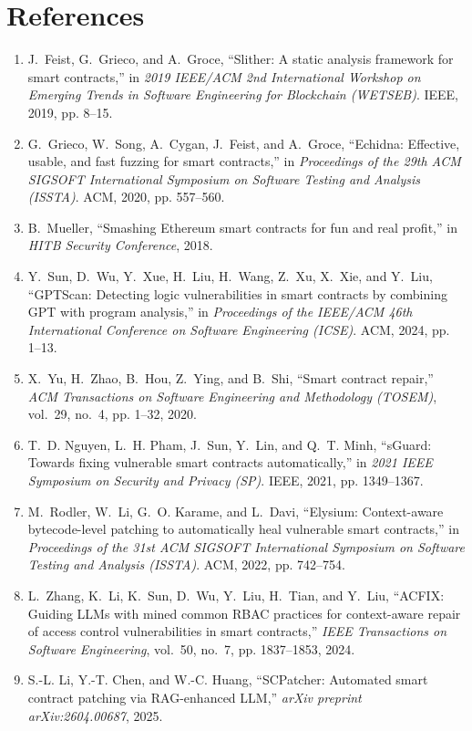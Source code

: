 \documentclass[conference]{IEEEtran}
\begin{document}
\section*{References}
\begin{enumerate}
\item J.~Feist, G.~Grieco, and A.~Groce, ``Slither: A static analysis framework for smart contracts,'' in \emph{2019 IEEE/ACM 2nd International Workshop on Emerging Trends in Software Engineering for Blockchain (WETSEB)}. IEEE, 2019, pp. 8--15.
\item G.~Grieco, W.~Song, A.~Cygan, J.~Feist, and A.~Groce, ``Echidna: Effective, usable, and fast fuzzing for smart contracts,'' in \emph{Proceedings of the 29th ACM SIGSOFT International Symposium on Software Testing and Analysis (ISSTA)}. ACM, 2020, pp. 557--560.
\item B.~Mueller, ``Smashing {Ethereum} smart contracts for fun and real profit,'' in \emph{HITB Security Conference}, 2018.
\item Y.~Sun, D.~Wu, Y.~Xue, H.~Liu, H.~Wang, Z.~Xu, X.~Xie, and Y.~Liu, ``{GPTScan}: Detecting logic vulnerabilities in smart contracts by combining {GPT} with program analysis,'' in \emph{Proceedings of the IEEE/ACM 46th International Conference on Software Engineering (ICSE)}. ACM, 2024, pp. 1--13.
\item X.~Yu, H.~Zhao, B.~Hou, Z.~Ying, and B.~Shi, ``Smart contract repair,'' \emph{ACM Transactions on Software Engineering and Methodology (TOSEM)}, vol.~29, no.~4, pp. 1--32, 2020.
\item T.~D. Nguyen, L.~H. Pham, J.~Sun, Y.~Lin, and Q.~T. Minh, ``{sGuard}: Towards fixing vulnerable smart contracts automatically,'' in \emph{2021 IEEE Symposium on Security and Privacy (SP)}. IEEE, 2021, pp. 1349--1367.
\item M.~Rodler, W.~Li, G.~O. Karame, and L.~Davi, ``Elysium: Context-aware bytecode-level patching to automatically heal vulnerable smart contracts,'' in \emph{Proceedings of the 31st ACM SIGSOFT International Symposium on Software Testing and Analysis (ISSTA)}. ACM, 2022, pp. 742--754.
\item L.~Zhang, K.~Li, K.~Sun, D.~Wu, Y.~Liu, H.~Tian, and Y.~Liu, ``{ACFIX}: Guiding {LLMs} with mined common {RBAC} practices for context-aware repair of access control vulnerabilities in smart contracts,'' \emph{IEEE Transactions on Software Engineering}, vol.~50, no.~7, pp. 1837--1853, 2024.
\item S.-L. Li, Y.-T. Chen, and W.-C. Huang, ``{SCPatcher}: Automated smart contract patching via {RAG}-enhanced {LLM},'' \emph{arXiv preprint arXiv:2604.00687}, 2025.

\end{enumerate}
\end{document}
